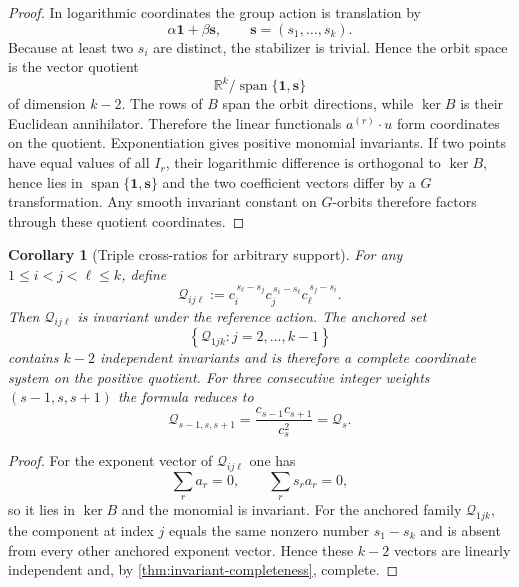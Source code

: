 \documentclass[aps,prd,reprint,onecolumn,nofootinbib,superscriptaddress,showkeys]{revtex4-2}
\numberwithin{equation}{section}
\theoremstyle{definition}
\theoremstyle{plain}
\newtheorem{corollary}{Corollary}[section]
\begin{document}
\begin{proof}
In logarithmic coordinates the group action is translation by
\[
\alpha\mathbf 1+\beta\mathbf s,
\qquad
\mathbf s=(s_1,\ldots,s_k).
\]
Because at least two $s_i$ are distinct, the stabilizer is trivial.  Hence the orbit space is the vector quotient
\[
\mathbb R^k/\operatorname{span}\{\mathbf 1,\mathbf s\}
\]
of dimension $k-2$.  The rows of $B$ span the orbit directions, while $\ker B$ is their Euclidean annihilator.  Therefore the linear functionals $a^{(r)}\cdot u$ form coordinates on the quotient.  Exponentiation gives positive monomial invariants.  If two points have equal values of all $I_r$, their logarithmic difference is orthogonal to $\ker B$, hence lies in $\operatorname{span}\{\mathbf 1,\mathbf s\}$ and the two coefficient vectors differ by a $G$ transformation.  Any smooth invariant constant on $G$-orbits therefore factors through these quotient coordinates.
\end{proof}

\begin{corollary}[Triple cross-ratios for arbitrary support]\label{cor:triple-crossratio}
For any $1\le i<j<\ell\le k$, define
\begin{equation}
\boxed{
\mathcal Q_{ij\ell}
:=
c_i^{\,s_\ell-s_j}
 c_j^{\,s_i-s_\ell}
 c_\ell^{\,s_j-s_i}.
}
\end{equation}
Then $\mathcal Q_{ij\ell}$ is invariant under the reference action.  The anchored set
\begin{equation}
\left\{\mathcal Q_{1j k}:j=2,\ldots,k-1\right\}
\end{equation}
contains $k-2$ independent invariants and is therefore a complete coordinate system on the positive quotient.  For three consecutive integer weights $(s-1,s,s+1)$ the formula reduces to
\[
\mathcal Q_{s-1,s,s+1}=\frac{c_{s-1}c_{s+1}}{c_s^2}=\mathcal Q_s.
\]
\end{corollary}

\begin{proof}
For the exponent vector of $\mathcal Q_{ij\ell}$ one has
\[
\sum_r a_r=0,
\qquad
\sum_r s_ra_r=0,
\]
so it lies in $\ker B$ and the monomial is invariant.  For the anchored family $\mathcal Q_{1jk}$, the component at index $j$ equals the same nonzero number $s_1-s_k$ and is absent from every other anchored exponent vector.  Hence these $k-2$ vectors are linearly independent and, by \cref{thm:invariant-completeness}, complete.
\end{proof}
\end{document}
